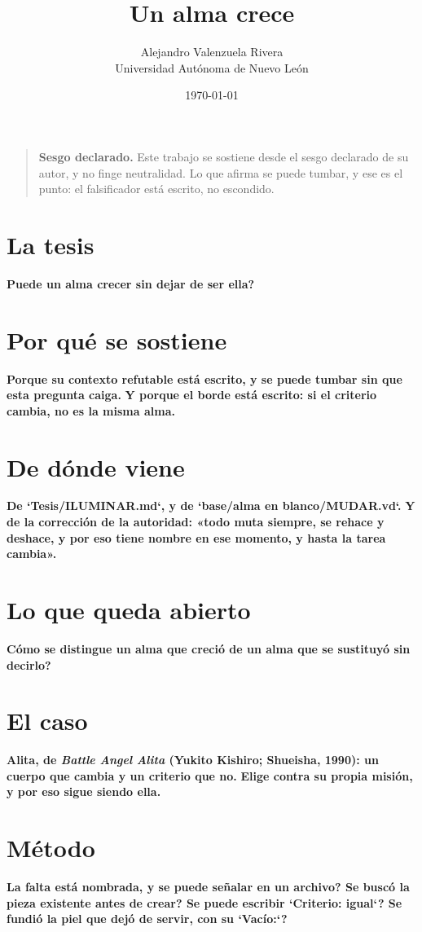 \documentclass[11pt,a4paper]{article}
\title{Un alma crece}
\author{Alejandro Valenzuela Rivera\\\small Universidad Autónoma de Nuevo León}
\date{\today}
\begin{document}
\maketitle

\begin{quote}
\textbf{Sesgo declarado.} Este trabajo se sostiene desde el sesgo declarado de su autor, y no finge neutralidad. Lo que afirma se puede tumbar, y ese es el punto: el falsificador está escrito, no escondido.
\end{quote}

\section{La tesis}
\textbf{\textquestiondown{}Puede un alma crecer sin dejar de ser ella?}

\section{Por qué se sostiene}
\textbf{Porque su contexto refutable está escrito, y se puede tumbar sin que esta pregunta caiga.} \textbf{Y porque el borde está escrito: si el criterio cambia, no es la misma alma.}

\section{De dónde viene}
\textbf{De `Tesis/ILUMINAR.md`, y de `base/alma en blanco/MUDAR.vd`.} \textbf{Y de la corrección de la autoridad: «todo muta siempre, se rehace y deshace, y por eso tiene nombre en ese momento, y hasta la tarea cambia».}

\section{Lo que queda abierto}
\textbf{\textquestiondown{}Cómo se distingue un alma que creció de un alma que se sustituyó sin decirlo?}

\section{El caso}
\textbf{Alita, de \emph{Battle Angel Alita} (Yukito Kishiro; Shueisha, 1990): un cuerpo que cambia y un criterio que no.} \textbf{Elige contra su propia misión, y por eso sigue siendo ella.}

\section{Método}
\textbf{\textquestiondown{}La falta está nombrada, y se puede señalar en un archivo? \textquestiondown{}Se buscó la pieza existente antes de crear? \textquestiondown{}Se puede escribir `Criterio: igual`? \textquestiondown{}Se fundió la piel que dejó de servir, con su `Vacío:`?}
\end{document}
